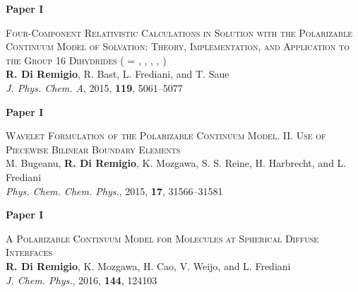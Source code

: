 \thispagestyle{empty}
\vspace*{\fill}
\begin{flushright}
\Huge{\textbf{Paper I}}
\end{flushright}

\Large{
\textsc{Four-Component Relativistic Calculations in Solution with the
Polarizable Continuum Model of Solvation: Theory,
Implementation, and Application to the
Group 16 Dihydrides
 ( = , , , ,
    )}
\\
\textbf{R. Di Remigio}, R. Bast, L. Frediani, and T. Saue
\\
\textit{J. Phys. Chem. A}, \textrm{2015}, \textbf{119}, 5061--5077
}
\vspace*{\fill}



\thispagestyle{empty}
\vspace*{\fill}
\begin{flushright}
\Huge{\textbf{Paper I}}
\end{flushright}

\Large{
\textsc{
Wavelet Formulation of the Polarizable Continuum Model. II. Use of Piecewise
Bilinear Boundary Elements
}
\\
M. Bugeanu, \textbf{R. Di Remigio}, K. Mozgawa, S. S. Reine, H.
Harbrecht,  and L. Frediani
\\
\textit{Phys. Chem. Chem. Phys.}, \textrm{2015}, \textbf{17},
31566--31581
}
\vspace*{\fill}



\thispagestyle{empty}
\vspace*{\fill}
\begin{flushright}
\Huge{\textbf{Paper I}}
\end{flushright}

\Large{
\textsc{
    A Polarizable Continuum Model for Molecules at Spherical
    Diffuse Interfaces
}
\\
    \textbf{R. Di Remigio}, K. Mozgawa, H. Cao, V. Weijo, and L.
    Frediani
\\
    \textit{J. Chem. Phys.}, \textrm{2016}, \textbf{144}, 124103
}
\vspace*{\fill}


